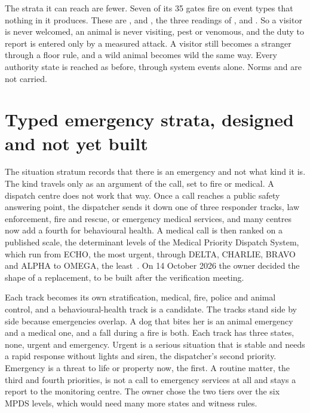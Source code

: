 The strata it can reach are fewer. Seven of its 35 gates fire on event types that nothing in it
produces. These are ,  and , the
three readings of , and . So a visitor is never welcomed,
an animal is never visiting, pest or venomous, and the duty to report is entered only by a measured
attack. A visitor still becomes a stranger through a floor rule, and a wild animal becomes wild the
same way. Every authority state is reached as before, through system events alone. Norms
 and  are not carried.

\section{Typed emergency strata, designed and not yet built}\label{sec:cont-emergency-tracks}

The situation stratum records that there is an emergency and not what kind it is. The kind travels
only as an argument of the call,  set to fire or medical. A dispatch centre does not
work that way. Once a call reaches a public safety answering point, the dispatcher sends it down one
of three responder tracks, law enforcement, fire and rescue, or emergency medical services, and many
centres now add a fourth for behavioural health. A medical call is then ranked on a published scale,
the determinant levels of the Medical Priority Dispatch System, which run from ECHO, the most urgent,
through DELTA, CHARLIE, BRAVO and ALPHA to OMEGA, the least~\cite{iaed2026determinants}. On 14 October
2026 the owner decided the shape of a replacement, to be built after the verification meeting.

Each track becomes its own stratification, medical, fire, police and animal control, and a
behavioural-health track is a candidate. The tracks stand side by side because emergencies overlap.
A dog that bites her is an animal emergency and a medical one, and a fall during a fire is both. Each
track has three states, none, urgent and emergency. Urgent is a serious situation that is stable and
needs a rapid response without lights and siren, the dispatcher's second priority. Emergency is a
threat to life or property now, the first. A routine matter, the third and fourth priorities, is not
a call to emergency services at all and stays a report to the monitoring centre. The owner chose the
two tiers over the six MPDS levels, which would need many more states and witness rules.

